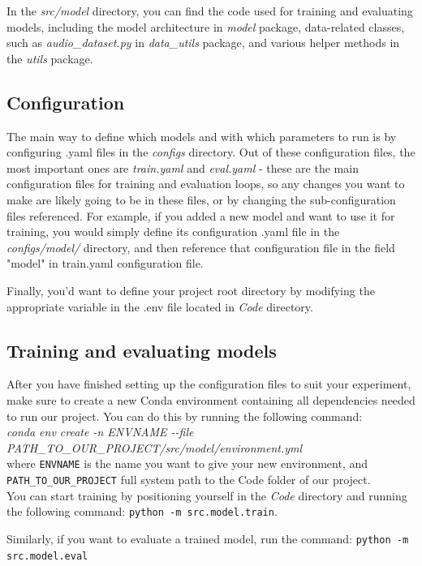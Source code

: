 \documentclass{ol-softwaremanual}
\begin{document}
In the \textit{src\slash model} directory, you can find the code used for training and evaluating models, including the model architecture in \textit{model} package, data-related classes, such as \textit{audio\_dataset.py} in \textit{data\_utils} package, and various helper methods in the \textit{utils} package. \clearpage


\subsection{Configuration}

The main way to define which models and with which parameters to run is by configuring .yaml files in the \textit{configs} directory.  Out of these configuration files, the most important ones are \textit{train.yaml} and \textit{eval.yaml} - these are the main configuration files for training and evaluation loops, so any changes you want to make are likely going to be in these files, or by changing the sub-configuration files referenced. For example, if you added a new model and want to use it for training, you would simply define its configuration .yaml file in the \textit{configs\slash model\slash} directory, and then reference that configuration file in the field "model" in train.yaml configuration file.


Finally, you'd want to define your project root directory by modifying the appropriate variable in the .env file located in \textit{Code} directory.

\subsection{Training and evaluating models}

After you have finished setting up the configuration files to suit your experiment, make sure to create a new Conda environment containing all dependencies needed to run our project. You can do this by running the following command: \\

\noindent \textit{conda env create -n ENVNAME \--\--file PATH\_TO\_OUR\_PROJECT/src/model/environment.yml} \\

\noindent where \texttt{ENVNAME} is the name you want to give your new environment, and \texttt{PATH\_TO\_OUR\_PROJECT} full system path to the Code folder of our project. \\

You can start training by positioning yourself in the \textit{Code} directory and running the following command: \newline
\texttt{python -m src.model.train}. \newline

Similarly, if you want to evaluate a trained model, run the command: \newline \texttt{python -m src.model.eval}
\end{document}
